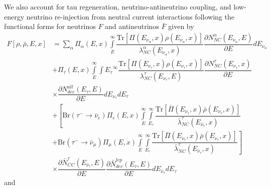 \documentclass[main.tex]{subfiles}
\begin{document}
We also account for tau regeneration, neutrino-antineutrino coupling, and low-energy neutrino re-injection from neutral current interactions following the functional forms for neutrinos $F$ and antineutrinos $\bar{F}$ given by 
\begin{equation}\begin{split}
    F\left[\rho,\bar{\rho}, E, x\right] &= \sum\limits_{\alpha} \Pi_{\alpha}(E,x)\int\limits_{E}^{\infty}\dfrac{\text{Tr}\left[ \Pi(E_{\nu_{\alpha}},x)\rho(E_{\nu_{\alpha}}, x) \right]}{\lambda_{NC}^{\alpha}(E_{\nu_{\alpha}}, x) } \dfrac{\partial N_{NC}^{\alpha}(E_{\nu_{\alpha}}, E)}{\partial E} dE_{\nu_{\alpha}} \\ 
    &+\Pi_{\tau}(E,x) \int\limits_{E}^{\infty}\int\limits{E_{\tau}}^{\infty} \dfrac{\text{Tr}\left[ \Pi(E_{\nu_{\tau}},x)\rho(E_{\nu_{\tau}}, x) \right]}{\lambda_{NC}^{\tau}(E_{\nu_{\tau}}, E) } \dfrac{\partial N_{NC}^{\tau}(E_{\nu_{\tau}}, x)}{\partial E} \\
    &\times \dfrac{\partial N_{dec}^{all}(E_{\tau}, E)}{\partial E} dE_{\nu_{\tau}}dE_{\tau} \\
    &+\left[ \text{Br}\left(\tau^{-} \to \bar{\nu}_{e}\right)\Pi_{e}(E,x)\int\limits_{E}^{\infty}\int\limits_{E_{\tau}}^{\infty} \dfrac{\text{Tr}\left[ \bar{\Pi}(E_{\nu_{\tau}},x)\bar{\rho}(E_{\nu_{\tau}}, x) \right]}{\bar{\lambda}_{NC}^{\tau}(E_{\bar{\nu}_{\tau}}, x) }\right.  \\
    &+ \left. \text{Br}\left(\tau^{-} \to \bar{\nu}_{\mu}\right)\Pi_{\mu}(E,x)\int\limits_{E}^{\infty}\int\limits_{E_{\tau}}^{\infty} \dfrac{\text{Tr}\left[ \bar{\Pi}(E_{\nu_{\tau}},x)\bar{\rho}(E_{\nu_{\tau}}, x) \right]}{\bar{\lambda}_{NC}^{\tau}(E_{\bar{\nu}_{\tau}}, x) } \right] \\
    &\times \dfrac{\partial \bar{N}_{CC}^{\tau}(E_{\bar{\nu}_{\tau}}, E)}{\partial E} \dfrac{\partial\bar{N}_{dec}^{lep} (E_{\tau}, E)}{\partial E} dE_{\bar{\nu}_{\tau}} dE_{\tau}
\end{split}\end{equation}
and 
\end{document}
